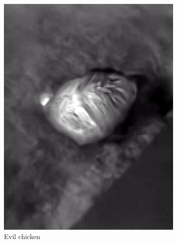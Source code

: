 \documentclass{l4proj}
\begin{document}
\begin{figure}[ht]
\begin{subfigure}[h!]{0.18\textwidth}
    \includegraphics[width=\textwidth, trim={0cm 2.5cm 0cm 2.5cm}, clip]{images/dataset/evil_chicken/lwir.png}
    \caption{Evil chicken}
  \end{subfigure}
  \begin{subfigure}[h!]{0.18\textwidth}

\end{subfigure}
\end{figure}
\end{document}
